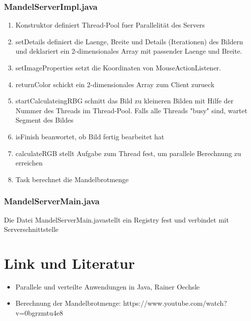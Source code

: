 \documentclass{article}
\begin{document}
	\subsubsection{MandelServerImpl.java}
	\begin{enumerate}
		\item Konstruktor definiert Thread-Pool fuer Parallelität des Servers
			
		\item setDetails definiert die Laenge, Breite und Details (Iterationen) des Bildern und deklariert ein 2-dimensionales Array mit passender Laenge und Breite.
			
		\item setImageProperties setzt die Koordinaten von MouseActionListener.
			
		\item returnColor schickt ein 2-dimensionales Array zum Client zurueck
			
		\newpage		
		\item startCalculateingRBG schnitt das Bild zu kleineren Bilden mit Hilfe der Nummer des Threads im Thread-Pool. Falls alle Threads "busy" sind, wartet Segment des Bildes 
			
		\item isFinish beanwortet, ob Bild fertig bearbeitet hat
			
		\item calculateRGB stellt Aufgabe zum Thread fest, um parallele Berechnung zu erreichen
			
		\newpage
		\item Task berechnet die Mandelbrotmenge
			
	\end{enumerate}
	
	\subsubsection{MandelServerMain.java}
	Die Datei \glqq MandelServerMain.java\grqq stellt ein Registry fest und verbindet mit Serverschnittstelle
	
	
	\newpage
	\section{Link und Literatur}
	\begin{itemize}
		\item Parallele und verteilte Anwendungen in Java, Rainer Oechsle
		\item Berechnung der Mandelbrotmenge: https://www.youtube.com/watch?v=0bgrzmtu4e8
	\end{itemize}
\end{document}
